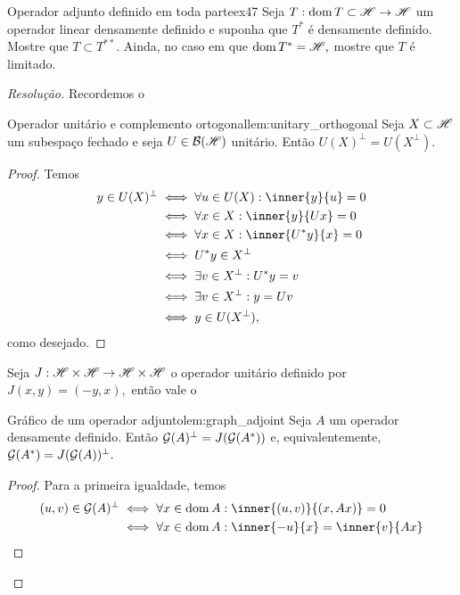 \begin{exercício}{Operador adjunto definido em toda parte}{ex47}
  Seja \(T : \operatorname{dom}{T} \subset\mathscr{H} \to \mathscr{H}\) um operador linear densamente definido e suponha que \(T^*\) é densamente definido. Mostre que \(T \subset T^{**}.\) Ainda, no caso em que \(\operatorname{dom}{T^*} = \mathscr{H},\) mostre que \(T\) é limitado.
\end{exercício}
\begin{proof}[Resolução]
  Recordemos o
  \begin{lemma}{Operador unitário e complemento ortogonal}{lem:unitary_orthogonal}
      Seja \(X \subset \mathscr{H}\) um subespaço fechado e seja \(U \in \mathcal{B}(\mathscr{H})\) unitário. Então \(U(X)^\perp = U(X^\perp).\)
  \end{lemma}
  \begin{proof}
      Temos
      \begin{align*}
        y \in U(X)^\perp &\iff \forall u \in U(X) : \inner{y}{u} = 0\\
                         &\iff \forall x \in X : \inner{y}{Ux} = 0\\
                         &\iff \forall x \in X : \inner{U^*y}{x} = 0\\
                         &\iff U^*y \in X^\perp\\
                         &\iff \exists v \in X^\perp : U^*y = v\\
                         &\iff \exists v \in X^\perp : y = Uv\\
                         &\iff y \in U(X^\perp),
      \end{align*}
      como desejado.
  \end{proof}
  Seja \(J : \mathscr{H} \times \mathscr{H} \to \mathscr{H} \times \mathscr{H}\) o operador unitário definido por \(J(x,y) = (-y,x),\) então vale o
  \begin{lemma}{Gráfico de um operador adjunto}{lem:graph_adjoint}
    Seja \(A\) um operador densamente definido. Então \(\mathcal{G}(A)^\perp = J(\mathcal{G}(A^*))\) e, equivalentemente, \(\mathcal{G}(A^*) = J(\mathcal{G}(A))^\perp.\)
  \end{lemma}
  \begin{proof}
    Para a primeira igualdade, temos
    \begin{align*}
      (u, v) \in \graph{A}^\perp &\iff \forall x \in \dom{A} : \inner{(u,v)}{(x, Ax)} = 0\\
                                 &\iff \forall x \in \dom{A} : \inner{-u}{x} = \inner{v}{Ax}\\

\end{align*}
\end{proof}
\end{proof}
